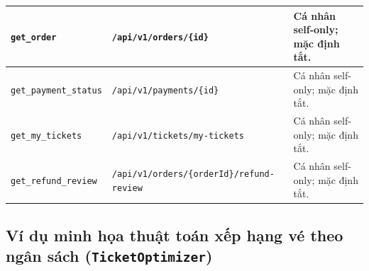 \begin{longtable}{|L{3.7cm}|L{6.4cm}|L{4.3cm}|}
\hline
\texttt{get\_\allowbreak order} & \nolinkurl{/api/v1/orders/{id}} & Cá nhân self-only; mặc định tắt. \\
\hline
\texttt{get\_\allowbreak payment\_\allowbreak status} & \nolinkurl{/api/v1/payments/{id}} & Cá nhân self-only; mặc định tắt. \\
\hline
\texttt{get\_\allowbreak my\_\allowbreak tickets} & \nolinkurl{/api/v1/tickets/my-tickets} & Cá nhân self-only; mặc định tắt. \\
\hline
\texttt{get\_\allowbreak refund\_\allowbreak review} & \nolinkurl{/api/v1/orders/{orderId}/refund-review} & Cá nhân self-only; mặc định tắt. \\
\hline
\end{longtable}
\endgroup

\subsection{Ví dụ minh họa thuật toán xếp hạng vé theo ngân sách (\texttt{TicketOptimizer})}

